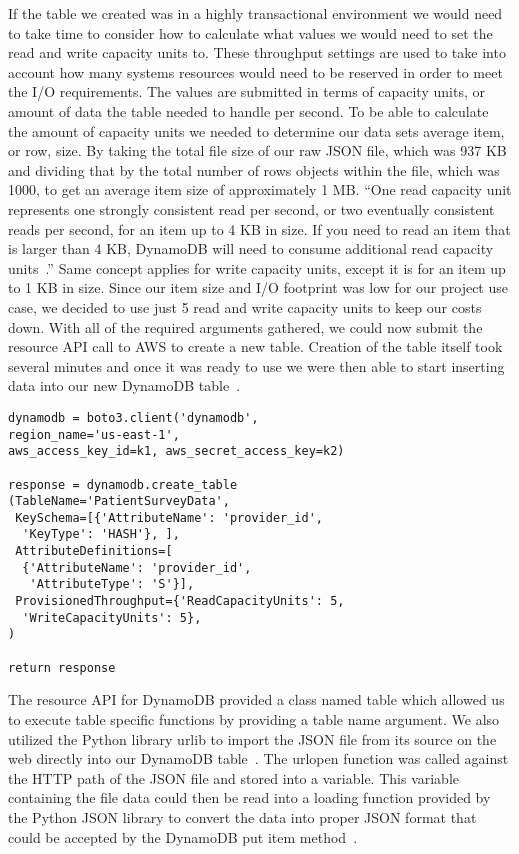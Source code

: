 If the table we created was in a highly transactional environment we would 
need to take time to consider how to calculate what values we would need to 
set the read and write capacity units to. These throughput settings are used 
to take into account how many systems resources would need to be reserved in 
order to meet the I/O requirements. The values are submitted in terms of 
capacity units, or amount of data the table needed to handle per second. 
To be able to calculate the amount of capacity units we needed to determine 
our data sets average item, or row, size. By taking the total file size of 
our raw JSON file, which was 937 KB and dividing that by the total number of 
rows objects within the file, which was 1000, to get an average item size of 
approximately 1 MB. ``One read capacity unit represents one strongly 
consistent read per second, or two eventually consistent reads per second, 
for an item up to 4 KB in size. If you need to read an item that is larger 
than 4 KB, DynamoDB will need to consume additional read capacity 
units~\cite{hid-sp18-521-dynamodbreadwrite}.'' Same concept applies for write 
capacity units, except it is for an item up to 1 KB in size. Since our item 
size and I/O footprint was low for our project use case, we decided to use 
just 5 read and write capacity units to keep our costs down. With all of the 
required arguments gathered, we could now submit the resource API call to AWS 
to create a new table. Creation of the table itself took several minutes and 
once it was ready to use we were then able to start inserting data into our
new DynamoDB table~\cite{hid-sp18-521-dynamodbreadwrite}.  

\begin{verbatim}
dynamodb = boto3.client('dynamodb', 
region_name='us-east-1', 
aws_access_key_id=k1, aws_secret_access_key=k2)

response = dynamodb.create_table
(TableName='PatientSurveyData',
 KeySchema=[{'AttributeName': 'provider_id',
  'KeyType': 'HASH'}, ],
 AttributeDefinitions=[
  {'AttributeName': 'provider_id', 
   'AttributeType': 'S'}],
 ProvisionedThroughput={'ReadCapacityUnits': 5, 
  'WriteCapacityUnits': 5},
)

return response
\end{verbatim}

The resource API for DynamoDB provided a class named table which allowed us to 
execute table specific functions by providing a table name argument. We also 
utilized the Python library urlib to import the JSON file from its source on 
the web directly into our DynamoDB table~\cite{hid-sp18-521-urllib}. The 
urlopen function was called against the HTTP path of the JSON file and stored 
into a variable. This variable containing the file data could then be read 
into a loading function provided by the Python JSON library to convert the 
data into proper JSON format that could be accepted by the DynamoDB put item 
method~\cite{hid-sp18-521-botodynamodb}.  

